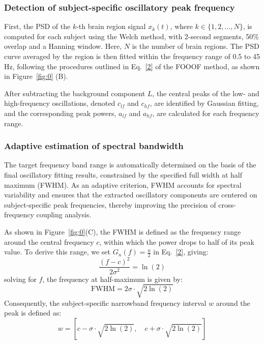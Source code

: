 \documentclass[lettersize,journal]{IEEEtran}
\begin{document}
\subsubsection{Detection of subject-specific oscillatory peak frequency}  

First, the PSD of the \( k \)-th brain region signal \( x_k(t) \), where \( k \in \{1, 2, \dots, N\} \), is computed for each subject using the Welch method, with 2-second segments, 50\% overlap and a Hanning window. Here, \(N\) is the number of brain regions. The PSD curve averaged by the region is then fitted within the frequency range of 0.5 to 45 Hz, following the procedures outlined in Eq.~\eqref{2} of the FOOOF method, as shown in Figure~\ref{fig:0} (B).

After subtracting the background component \( L \), the central peaks of the low- and high-frequency oscillations, denoted \( c_{lf} \) and \( c_{hf} \), are identified by Gaussian fitting, and the corresponding peak powers, \( a_{lf} \) and \( a_{hf} \), are calculated for each frequency range.

\subsubsection{Adaptive estimation of spectral bandwidth}  

The target frequency band range is automatically determined on the basis of the final oscillatory fitting results, constrained by the specified full width at half maximum (FWHM). As an adaptive criterion, FWHM accounts for spectral variability and ensures that the extracted oscillatory components are centered on subject-specific peak frequencies, thereby improving the precision of cross-frequency coupling analysis.

As shown in Figure~\ref{fig:0}(C), the FWHM is defined as the frequency range around the central frequency \( c \), within which the power drops to half of its peak value. To derive this range, we set \( G_n(f) = \frac{a}{2} \) in Eq.~\eqref{2}, giving:
\begin{equation}
\frac{(f - c)^2}{2 \sigma^2} = \ln(2)
\label{8}
\end{equation}
solving for \( f \), the frequency at half-maximum is given by:
\begin{equation}
\mathrm{FWHM} = 2 \sigma \cdot \sqrt{2 \ln(2)}
\label{9}
\end{equation}
Consequently, the subject-specific narrowband frequency interval \( w \) around the peak is defined as:
\begin{equation}
w = \left[ c - \sigma \cdot \sqrt{2 \ln(2)}, \quad c + \sigma \cdot \sqrt{2 \ln(2)} \right]
\label{10}
\end{equation}
\end{document}

